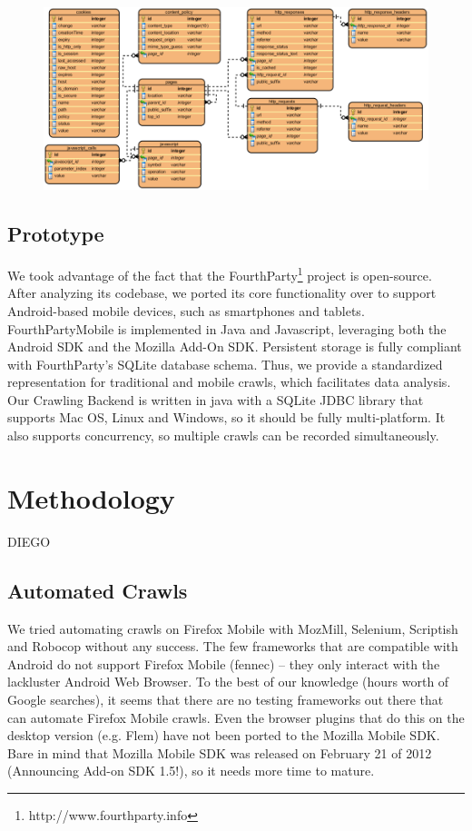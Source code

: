\documentclass{acm_proc_article-sp}
\begin{document}
\begin{figure}[ht] 
\centering \includegraphics[scale=0.70]{diagrams/db_diagram.png}
\label{fig:db_schema}
\end{figure}

\subsection{Prototype}
We took advantage of the fact that the FourthParty\footnote{http://www.fourthparty.info} project is open-source. After analyzing its codebase, we ported its core functionality over to support Android-based mobile devices, such as smartphones and tablets. FourthPartyMobile is implemented in Java and Javascript, leveraging both the Android SDK and the Mozilla Add-On SDK. Persistent storage is fully compliant with FourthParty's SQLite database schema. Thus, we provide a standardized representation for traditional and mobile crawls, which facilitates data analysis. Our Crawling Backend is written in java with a SQLite JDBC library that supports Mac OS, Linux and Windows, so it should be fully multi-platform. It also supports concurrency, so multiple crawls can be recorded simultaneously. 

\section{Methodology}
DIEGO

\subsection{Automated Crawls}

We tried automating crawls on Firefox Mobile with MozMill, Selenium, Scriptish and Robocop without any success. The few frameworks that are compatible with Android do not support Firefox Mobile (fennec) – they only interact with the lackluster Android Web Browser. To the best of our knowledge (hours worth of Google searches), it seems that there are no testing frameworks out there that can automate Firefox Mobile crawls. Even the browser plugins that do this on the desktop version (e.g. Flem) have not been ported to the Mozilla Mobile SDK. Bare in mind that Mozilla Mobile SDK was released on February 21 of 2012 (Announcing Add-on SDK 1.5!), so it needs more time to mature.
\end{document}
